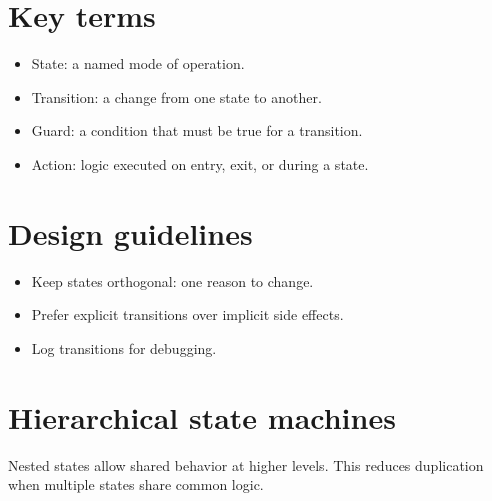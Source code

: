 \documentclass[letterpaper,10pt,english]{sphinxmanual}
\begin{document}
\section{Key terms}
\label{\detokenize{appendix_k_state_machine:key-terms}}\begin{itemize}
\item {} 
\sphinxAtStartPar
State: a named mode of operation.

\item {} 
\sphinxAtStartPar
Transition: a change from one state to another.

\item {} 
\sphinxAtStartPar
Guard: a condition that must be true for a transition.

\item {} 
\sphinxAtStartPar
Action: logic executed on entry, exit, or during a state.

\end{itemize}


\section{Design guidelines}
\label{\detokenize{appendix_k_state_machine:design-guidelines}}\begin{itemize}
\item {} 
\sphinxAtStartPar
Keep states orthogonal: one reason to change.

\item {} 
\sphinxAtStartPar
Prefer explicit transitions over implicit side effects.

\item {} 
\sphinxAtStartPar
Log transitions for debugging.

\end{itemize}


\section{Hierarchical state machines}
\label{\detokenize{appendix_k_state_machine:hierarchical-state-machines}}
\sphinxAtStartPar
Nested states allow shared behavior at higher levels. This reduces duplication
when multiple states share common logic.
\end{document}
